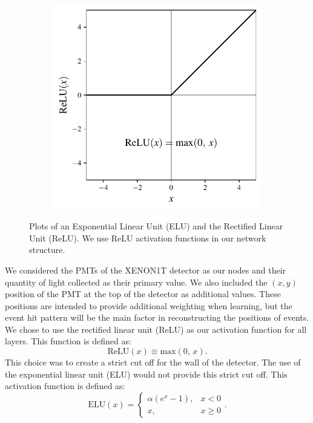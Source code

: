 \documentclass[../thesis.tex]{subfiles}
\begin{document}
\begin{figure}[t]
\begin{subfigure}{0.49\textwidth}
		\includegraphics[width=\textwidth]{figures/relu.pdf}
	\end{subfigure}
	\caption{
	Plots of an Exponential Linear Unit (ELU) and the Rectified Linear Unit (ReLU).
	We use ReLU activation functions in our network structure.
	}
	\label{fig:relu-elu}
\end{figure}
\par We considered the PMTs of the XENON1T detector as our nodes and their quantity of light collected as their primary value.
We also included the $(x,y)$ position of the PMT at the top of the detector as additional values.
These positions are intended to provide additional weighting when learning, but the event hit pattern will be the main factor in reconstructing the positions of events.
We chose to use the rectified linear unit (ReLU) as our activation function for all layers.
This function is defined as:
\begin{equation} \label{eq:relu}
	\text{ReLU}\left( x \right) \equiv \text{max}\left(0,\,x\right) .
\end{equation}
This choice was to create a strict cut off for the wall of the detector.
The use of the exponential linear unit (ELU) would not provide this strict cut off.
This activation function is defined as:
\begin{equation} \label{eq:elu}
	\text{ELU}(x) =
	\begin{cases}
		\alpha \left(e^{x} - 1\right), & x < 0 \\
		x, & x \geq 0
	\end{cases} .
\end{equation}
\end{document}
